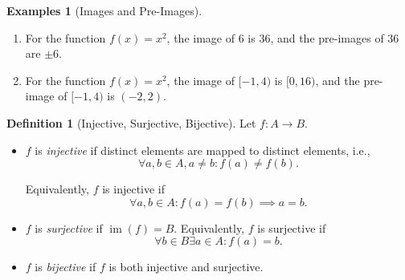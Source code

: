 \documentclass{article}
\theoremstyle{definition}
\newtheorem{definition}[theorem]{Definition}
\newtheorem{examples}[theorem]{Examples}
\theoremstyle{remark}
\newcommand{\pqty}[1]{\left(#1\right)}
\newcommand{\functiondomain}[3]{#1:#2\to #3}
\newcommand{\cointv}[2]{[#1,#2)}
\newcommand{\oointv}[2]{(#1,#2)}
\newcommand{\img}{\operatorname{im}}
\begin{document}
\begin{examples}[Images and Pre-Images]
    \begin{enumerate}
        \item For the function \(f\pqty{x} = x^2\), the image of \(6\) is \(36\), and the pre-images of \(36\) are \(\pm 6\).
        \item For the function \(f\pqty{x} = x^2\), the image of \(\cointv{-1}{4}\) is \(\cointv{0}{16}\), and the pre-image of \(\cointv{-1}{4}\) is \(\oointv{-2}{2}\).
    \end{enumerate}
\end{examples}

\begin{definition}[Injective, Surjective, Bijective]
    Let \(\functiondomain{f}{A}{B}\).
    
    \begin{itemize}
        \item \(f\) is \emph{injective} if distinct elements are mapped to distinct elements, i.e.,
        \[
            \forall a, b \in A, a \neq b: f\pqty{a} \neq f\pqty{b}.
        \]

        Equivalently, \(f\) is injective if
        \[
            \forall a, b \in A: f\pqty{a} = f\pqty{b} \implies a = b.
        \]

        \item \(f\) is \emph{surjective} if \(\img \pqty{f} = B\). Equivalently, \(f\) is surjective if
        \[
            \forall b \in B \exists a \in A: f\pqty{a} = b.
        \]

        \item \(f\) is \emph{bijective} if \(f\) is both injective and surjective.
    \end{itemize}
\end{definition}
\end{document}
